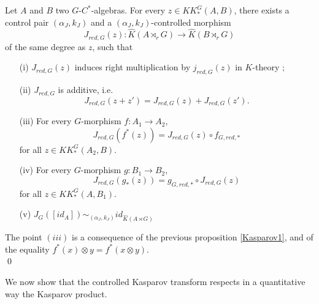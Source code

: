 \begin{prop}\label{Kasparov}
Let $A$ and $B$ two $G$-$C^*$-algebras. For every $z\in KK^G_*(A,B)$, there exists a control pair $(\alpha_J,k_J)$ and a $(\alpha_J,k_J)$-controlled morphism
\[J_{red,G}(z) : \hat K(A\rtimes_r G)\rightarrow \hat K(B\rtimes_r G)\]
of the same degree as $z$, such that
\begin{enumerate}
\item[(i)] $J_{red,G}(z)$ induces right multiplication by $j_{red,G}(z)$ in $K$-theory ;
\item[(ii)] $J_{red,G}$ is additive, i.e.
\[J_{red,G}(z+z')=J_{red,G}(z)+J_{red,G}(z').\]
\item[(iii)] For every $G$-morphism $f : A_1\rightarrow A_2$,
\[J_{red,G}(f^*(z))=J_{red,G}(z)\circ f_{G,red,*}\] for all $z\in KK_*^G(A_2,B)$.
\item[(iv)] For every $G$-morphism $g : B_1\rightarrow B_2$,
\[J_{red,G}(g_*(z))= g_{G,red,*}\circ J_{red,G}(z)\] for all $z\in KK_*^G(A,B_1)$.
\item[(v)] $J_G([id_A]) \sim_{(\alpha_J,k_J)} id_{\hat K(A\rtimes G)}$
\end{enumerate}
\end{prop}

\begin{dem}
The point $(iii)$ is a consequence of the previous proposition \ref{Kasparov1}, and of the equality $f^*(x)\otimes y = f^*(x\otimes y)$.\\
\qed
\end{dem}

We now show that the controlled Kasparov transform respects in a quantitative way the Kasparov product.

